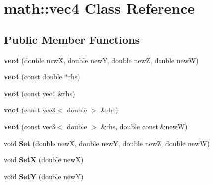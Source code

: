 \hypertarget{classmath_1_1vec4}{
\section{math::vec4 Class Reference}
\label{classmath_1_1vec4}
}
\subsection*{Public Member Functions}
\begin{DoxyCompactItemize}
\item 
\hypertarget{classmath_1_1vec4_a7d87cc58666ba2bd8971ad2391cc5aab}{
{\bfseries vec4} (double newX, double newY, double newZ, double newW)}
\label{classmath_1_1vec4_a7d87cc58666ba2bd8971ad2391cc5aab}

\item 
\hypertarget{classmath_1_1vec4_ab1ad829b90a2591e5bb75347c1fadc82}{
{\bfseries vec4} (const double $\ast$rhs)}
\label{classmath_1_1vec4_ab1ad829b90a2591e5bb75347c1fadc82}

\item 
\hypertarget{classmath_1_1vec4_a8224f93adc6359eecd7284d200e995c0}{
{\bfseries vec4} (const \hyperlink{classmath_1_1vec4}{vec4} \&rhs)}
\label{classmath_1_1vec4_a8224f93adc6359eecd7284d200e995c0}

\item 
\hypertarget{classmath_1_1vec4_a27b9583f08559eeef46a1f2b72494f2d}{
{\bfseries vec4} (const \hyperlink{classmath_1_1vec3}{vec3}$<$ double $>$ \&rhs)}
\label{classmath_1_1vec4_a27b9583f08559eeef46a1f2b72494f2d}

\item 
\hypertarget{classmath_1_1vec4_a5d645c6b0e18476c30c42aed782eeed0}{
{\bfseries vec4} (const \hyperlink{classmath_1_1vec3}{vec3}$<$ double $>$ \&rhs, double const \&newW)}
\label{classmath_1_1vec4_a5d645c6b0e18476c30c42aed782eeed0}

\item 
\hypertarget{classmath_1_1vec4_a0f52e2dc3efcf5544c64e226479613e4}{
void {\bfseries Set} (double newX, double newY, double newZ, double newW)}
\label{classmath_1_1vec4_a0f52e2dc3efcf5544c64e226479613e4}

\item 
\hypertarget{classmath_1_1vec4_acfa3682665ac3365b073671a0effd11e}{
void {\bfseries SetX} (double newX)}
\label{classmath_1_1vec4_acfa3682665ac3365b073671a0effd11e}

\item 
\hypertarget{classmath_1_1vec4_af0824f3f0ec0c6f81654fff148eb2033}{
void {\bfseries SetY} (double newY)}
\label{classmath_1_1vec4_af0824f3f0ec0c6f81654fff148eb2033}


\end{DoxyCompactItemize}
